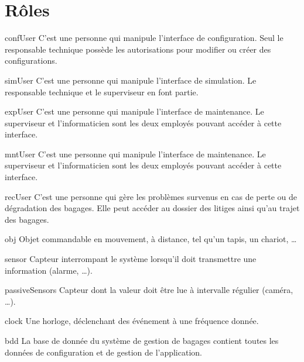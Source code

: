 \section{Rôles}


{confUser}
{C'est une personne qui manipule l'interface de configuration. Seul le responsable technique possède les autorisations pour modifier ou créer des configurations.}

{simUser}
{C'est une personne qui manipule l'interface de simulation. Le responsable technique et le superviseur en font partie.}

{expUser}
{C'est une personne qui manipule l'interface de maintenance. Le superviseur et l'informaticien sont les deux employés pouvant accéder à cette interface.}

{mntUser}
{C'est une personne qui manipule l'interface de maintenance. Le superviseur et l'informaticien sont les deux employés pouvant accéder à cette interface.}

{recUser}
{C'est une personne qui gère les problèmes survenus en cas de perte ou de dégradation des bagages. Elle peut accéder au dossier des litiges ainsi qu'au trajet des bagages.}

{obj}
{Objet commandable en mouvement, à distance, tel qu'un tapis, un chariot, \ldots}

{sensor}
{Capteur interrompant le système lorsqu'il doit transmettre une information (alarme, \ldots).}

{passiveSensors}
{Capteur dont la valeur doit être lue à intervalle régulier (caméra, \ldots).}

{clock}
{Une horloge, déclenchant des événement à une fréquence donnée.}

{bdd}
{La base de donnée du système de gestion de bagages contient toutes les données de configuration et de gestion de l'application.}


